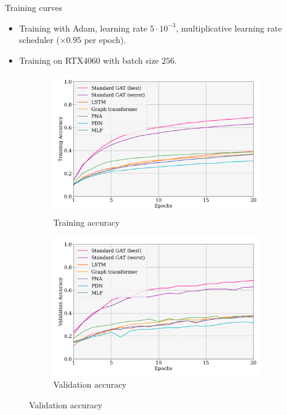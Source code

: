 \documentclass{beamer}
\begin{document}
\begin{frame}{Training curves}
    \begin{itemize}
        \item Training with Adam, learning rate $5\cdot 10^{-3}$, multiplicative learning rate scheduler ($\times0.95$ per epoch).
        \item Training on RTX4060 with batch size $256$.
    \end{itemize}
    \begin{figure}[H]
        \centering
        \begin{subfigure}{0.49\columnwidth}
            \centering
            \includegraphics[width=\columnwidth]{figures/train_accuracy.png}
            \caption{Training accuracy}
            \label{fig:train_accuracy}
        \end{subfigure}
        \begin{subfigure}{0.49\columnwidth}
            \centering
            \includegraphics[width=\columnwidth]{figures/val_accuracy.png}
            \caption{Validation accuracy}
            \label{fig:val_accuracy}
        \end{subfigure}
    \end{figure}
\end{frame}
\end{document}
